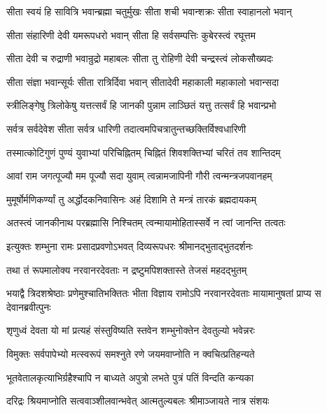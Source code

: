 \twolineshloka
{सीता स्वयं हि सावित्रि भवान्ब्रह्मा चतुर्मुखः}
{सीता शची भवान्शक्रः सीता स्वाहानलो भवान्}%

\twolineshloka
{सीता संहारिणी देवी यमरूपधरो भवान्}
{सीता हि सर्वसम्पत्तिः कुबेरस्त्वं रघूत्तम}%

\twolineshloka
{सीता देवी च रुद्राणी भवान्रुद्रो महाबलः}
{सीता तु रोहिणी देवी चन्द्रस्त्वं लोकसौख्यदः}%

\twolineshloka
{सीता संज्ञा भवान्सूर्यः सीता रात्रिर्दिवा भवान्}
{सीतादेवी महाकाली महाकालो भवान्सदा}%

\twolineshloka
{स्त्रीलिङ्गेषु त्रिलोकेषु यत्तत्सर्वं हि जानकी}
{पुन्नाम लाञ्छितं यत्तु तत्सर्वं हि भवान्प्रभो}%

\twolineshloka
{सर्वत्र सर्वदेवेश सीता सर्वत्र धारिणी}
{तदात्वमपिचत्रातुन्तच्छक्तिर्विश्वधारिणी}%

\twolineshloka
{तस्मात्कोटिगुणं पुण्यं युवाभ्यां परिचिह्नितम्}
{चिह्नितं शिवशक्तिभ्यां चरितं तव शान्तिदम्}%

\twolineshloka
{आवां राम जगत्पूज्यौ मम पूज्यौ सदा युवाम्}
{त्वन्नामजापिनी गौरी त्वन्मन्त्रजपवानहम्}%

\twolineshloka
{मुमूर्षोर्मणिकर्ण्यां तु अर्द्धोदकनिवासिनः}
{अहं दिशामि ते मन्त्रं तारकं ब्रह्मदायकम्}%

\twolineshloka
{अतस्त्वं जानकीनाथ परब्रह्मासि निश्चितम्}
{त्वन्मायामोहितास्सर्वे न त्वां जानन्ति तत्वतः}%


\twolineshloka
{इत्युक्तः शम्भुना रामः प्रसादप्रवणोऽभवत्}
{दिव्यरूपधरः श्रीमानद्भुताद्भुतदर्शनः}%

\twolineshloka
{तथा तं रूपमालोक्य नरवानरदेवताः}
{न द्रष्टुमपिशक्तास्ते तेजसं महदद्भुतम्}%


\threelineshloka
{भयाद्वै त्रिदशश्रेष्ठाः प्रणेमुश्चातिभक्तितः}
{भीता विज्ञाय रामोऽपि नरवानरदेवताः}
{मायामानुषतां प्राप्य स देवानब्रवीत्पुनः}%


\twolineshloka
{शृणुध्वं देवता यो मां प्रत्यहं संस्तुविष्यति}
{स्तवेन शम्भुनोक्तेन देवतुल्यो भवेन्नरः}%

\twolineshloka
{विमुक्तः सर्वपापेभ्यो मत्स्वरूपं समश्नुते}
{रणे जयमवाप्नोति न क्वचित्प्रतिहन्यते}%

\twolineshloka
{भूतवेतालकृत्याभिर्ग्रहैश्चापि न बाध्यते}
{अपुत्रो लभते पुत्रं पतिं विन्दति कन्यका}%

\twolineshloka
{दरिद्रः श्रियमाप्नोति सत्ववाञ्शीलवान्भवेत्}
{आत्मतुल्यबलः श्रीमाञ्जायते नात्र संशयः}%

